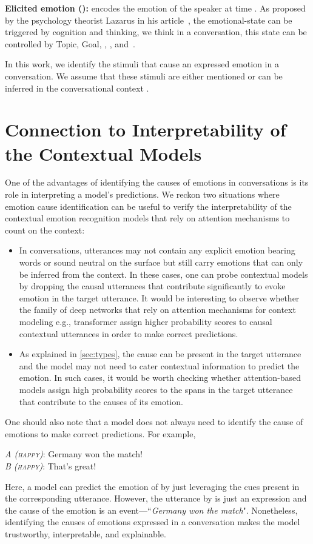 \documentclass[11pt,a4paper]{article}
\theoremstyle{definition}
\newcommand\emo[1]{\textsc{#1}}
\begin{document}
\textbf{Elicited emotion ():}  encodes the emotion of the speaker at time . As proposed by the psychology theorist Lazarus in his article~\citep{lazarus1982thoughts}, the emotional-state can be triggered by cognition and thinking, we think in a conversation, this state can be controlled by Topic, Goal, , , and~. 



In this work, we identify the stimuli  that cause an expressed emotion in a conversation. We assume that these stimuli are either mentioned or can be inferred in the conversational context .





\section{Connection to Interpretability of the Contextual Models}
One of the advantages of identifying the causes of emotions in conversations is its role in interpreting a model's predictions. We reckon two situations where emotion cause identification can be useful to verify the interpretability of the contextual emotion recognition models that rely on attention mechanisms to count on the context:

\begin{itemize}[leftmargin=*]
    \item In conversations, utterances may not contain any explicit emotion bearing words or sound neutral on the surface but still carry emotions that can only be inferred from the context. In these cases, one can probe contextual models by dropping the causal utterances that contribute significantly to evoke emotion in the target utterance. It would be interesting to observe whether the family of deep networks that rely on attention mechanisms for context modeling e.g., transformer assign higher probability scores to causal contextual utterances in order to make correct predictions.
    \item As explained in \cref{sec:types}, the cause can be present in the target utterance and the model may not need to cater contextual information to predict the emotion. In such cases, it would be worth checking whether attention-based models assign high probability scores to the spans in the target utterance that contribute to the causes of its emotion. 
\end{itemize}

One should also note that a model does not always need to identify the cause of emotions to make correct predictions. For example, 

\begin{exe}
\ex \textit{A (\emo{happy})}: Germany won the match!\\
\textit{B (\emo{happy})}: That's great!
\end{exe}

Here, a model can predict the emotion of  by just leveraging the cues present in the corresponding utterance. However, the utterance by  is just an expression and the cause of the emotion is an event---``\textit{Germany won the match}". Nonetheless, identifying the causes of emotions expressed in a conversation makes the model trustworthy, interpretable, and explainable. 
\end{document}
